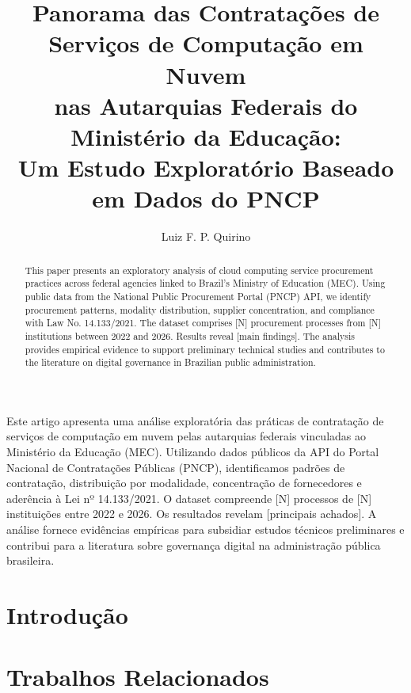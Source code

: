 \documentclass[12pt]{article}
\title{Panorama das Contratações de Serviços de Computação em Nuvem\\nas Autarquias Federais do Ministério da Educação:\\Um Estudo Exploratório Baseado em Dados do PNCP}
\author{Luiz F. P. Quirino\inst{1,2}}
\begin{document}
\maketitle

\begin{abstract}
This paper presents an exploratory analysis of cloud computing service procurement practices across federal agencies linked to Brazil's Ministry of Education (MEC). Using public data from the National Public Procurement Portal (PNCP) API, we identify procurement patterns, modality distribution, supplier concentration, and compliance with Law No. 14.133/2021. The dataset comprises [N] procurement processes from [N] institutions between 2022 and 2026. Results reveal [main findings]. The analysis provides empirical evidence to support preliminary technical studies and contributes to the literature on digital governance in Brazilian public administration.
\end{abstract}

\begin{resumo}
Este artigo apresenta uma análise exploratória das práticas de contratação de serviços de computação em nuvem pelas autarquias federais vinculadas ao Ministério da Educação (MEC). Utilizando dados públicos da API do Portal Nacional de Contratações Públicas (PNCP), identificamos padrões de contratação, distribuição por modalidade, concentração de fornecedores e aderência à Lei nº 14.133/2021. O dataset compreende [N] processos de [N] instituições entre 2022 e 2026. Os resultados revelam [principais achados]. A análise fornece evidências empíricas para subsidiar estudos técnicos preliminares e contribui para a literatura sobre governança digital na administração pública brasileira.
\end{resumo}

\section{Introdução}
\label{sec:intro}


\section{Trabalhos Relacionados}
\label{sec:relacionados}
\end{document}
